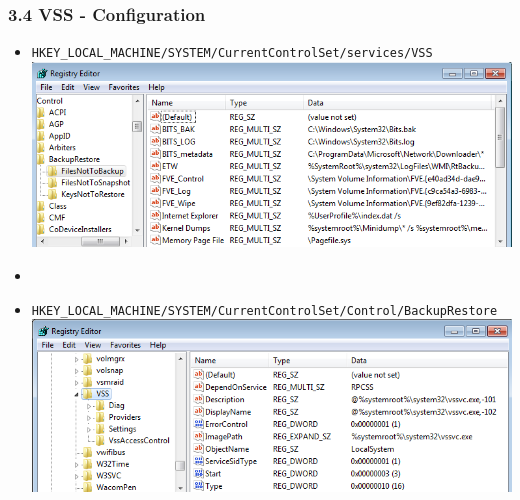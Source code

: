 \begin{frame}[fragile]
  \frametitle{3.4 VSS - Configuration}
	    \begin{itemize}
		    \item[] \scriptsize{\texttt{HKEY\_LOCAL\_MACHINE/SYSTEM/CurrentControlSet/services/VSS}}
		    \includegraphics[scale=.3]{images/VSSConfig2.png}
		    \item[]
	    \item[] \scriptsize{\texttt{HKEY\_LOCAL\_MACHINE/SYSTEM/CurrentControlSet/Control/BackupRestore}}
		    \includegraphics[scale=.3]{images/VSSConfig.png}
            \end{itemize}
\end{frame}



